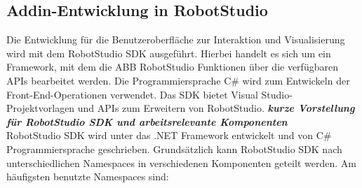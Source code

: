 \documentclass[14pt,a4paper,titlepage]{article}
\begin{document}
		\subsection{Addin-Entwicklung in RobotStudio}
			Die Entwicklung für die Benutzeroberfläche zur Interaktion und Visualisierung wird mit dem RobotStudio SDK ausgeführt. Hierbei handelt es sich um ein Framework, mit dem die ABB RobotStudio Funktionen über die verfügbaren APIs bearbeitet werden. Die Programmiersprache C\# wird zum Entwickeln der Front-End-Operationen verwendet. 
			Das SDK bietet Visual Studio-Projektvorlagen und APIs zum Erweitern von RobotStudio.
			\bigbreak
			\textbf{\emph{kurze Vorstellung für RobotStudio SDK und arbeitsrelevante Komponenten}}
			\\
			RobotStudio SDK wird unter das .NET Framework entwickelt und von C\# Programmiersprache geschrieben.  Grundsätzlich kann RobotStudio SDK nach unterschiedlichen Namespaces in verschiedenen Komponenten geteilt werden. Am häufigsten benutzte Namespaces sind:
\end{document}
